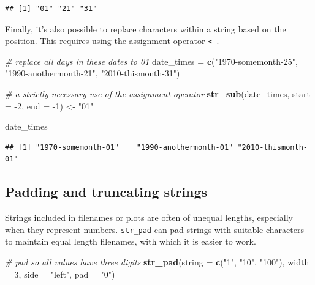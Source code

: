 \documentclass[]{book}
\newenvironment{Shaded}{}{}
\newcommand{\CommentTok}[1]{\textcolor[rgb]{0.38,0.63,0.69}{\textit{#1}}}
\newcommand{\DataTypeTok}[1]{\textcolor[rgb]{0.56,0.13,0.00}{#1}}
\newcommand{\DecValTok}[1]{\textcolor[rgb]{0.25,0.63,0.44}{#1}}
\newcommand{\KeywordTok}[1]{\textcolor[rgb]{0.00,0.44,0.13}{\textbf{#1}}}
\newcommand{\NormalTok}[1]{#1}
\newcommand{\StringTok}[1]{\textcolor[rgb]{0.25,0.44,0.63}{#1}}
\begin{document}
\begin{verbatim}
## [1] "01" "21" "31"
\end{verbatim}

Finally, it's also possible to replace characters within a string based on the position. This requires using the assignment operator \texttt{\textless{}-}.

\begin{Shaded}
\begin{Highlighting}[]
\CommentTok{# replace all days in these dates to 01}
\NormalTok{date_times =}\StringTok{ }\KeywordTok{c}\NormalTok{(}\StringTok{"1970-somemonth-25"}\NormalTok{,}
               \StringTok{"1990-anothermonth-21"}\NormalTok{,}
               \StringTok{"2010-thismonth-31"}\NormalTok{)}

\CommentTok{# a strictly necessary use of the assignment operator}
\KeywordTok{str_sub}\NormalTok{(date_times,}
        \DataTypeTok{start =} \DecValTok{-2}\NormalTok{, }\DataTypeTok{end =} \DecValTok{-1}\NormalTok{) <-}\StringTok{ "01"}

\NormalTok{date_times}
\end{Highlighting}
\end{Shaded}

\begin{verbatim}
## [1] "1970-somemonth-01"    "1990-anothermonth-01" "2010-thismonth-01"
\end{verbatim}

\hypertarget{padding-and-truncating-strings}{%
\subsection{Padding and truncating strings}\label{padding-and-truncating-strings}}

Strings included in filenames or plots are often of unequal lengths, especially when they represent numbers. \texttt{str\_pad} can pad strings with suitable characters to maintain equal length filenames, with which it is easier to work.

\begin{Shaded}
\begin{Highlighting}[]
\CommentTok{# pad so all values have three digits}
\KeywordTok{str_pad}\NormalTok{(}\DataTypeTok{string =} \KeywordTok{c}\NormalTok{(}\StringTok{"1"}\NormalTok{, }\StringTok{"10"}\NormalTok{, }\StringTok{"100"}\NormalTok{),}
        \DataTypeTok{width =} \DecValTok{3}\NormalTok{,}
        \DataTypeTok{side =} \StringTok{"left"}\NormalTok{,}
        \DataTypeTok{pad =} \StringTok{"0"}\NormalTok{)}
\end{Highlighting}
\end{Shaded}
\end{document}
